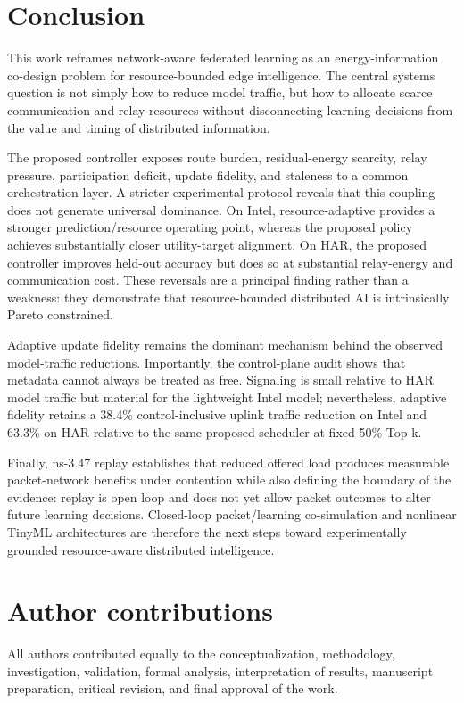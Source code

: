\documentclass[11pt]{article}
\begin{document}
\section{Conclusion}
This work reframes network-aware federated learning as an energy-information co-design problem for resource-bounded edge intelligence. The central systems question is not simply how to reduce model traffic, but how to allocate scarce communication and relay resources without disconnecting learning decisions from the value and timing of distributed information.\par
The proposed controller exposes route burden, residual-energy scarcity, relay pressure, participation deficit, update fidelity, and staleness to a common orchestration layer. A stricter experimental protocol reveals that this coupling does not generate universal dominance. On Intel, resource-adaptive provides a stronger prediction/resource operating point, whereas the proposed policy achieves substantially closer utility-target alignment. On HAR, the proposed controller improves held-out accuracy but does so at substantial relay-energy and communication cost. These reversals are a principal finding rather than a weakness: they demonstrate that resource-bounded distributed AI is intrinsically Pareto constrained.\par
Adaptive update fidelity remains the dominant mechanism behind the observed model-traffic reductions. Importantly, the control-plane audit shows that metadata cannot always be treated as free. Signaling is small relative to HAR model traffic but material for the lightweight Intel model; nevertheless, adaptive fidelity retains a 38.4\% control-inclusive uplink traffic reduction on Intel and 63.3\% on HAR relative to the same proposed scheduler at fixed 50\% Top-k.\par
Finally, ns-3.47 replay establishes that reduced offered load produces measurable packet-network benefits under contention while also defining the boundary of the evidence: replay is open loop and does not yet allow packet outcomes to alter future learning decisions. Closed-loop packet/learning co-simulation and nonlinear TinyML architectures are therefore the next steps toward experimentally grounded resource-aware distributed intelligence.\par
\section{Author contributions}
All authors contributed equally to the conceptualization, methodology, investigation, validation, formal analysis, interpretation of results, manuscript preparation, critical revision, and final approval of the work.\par
\end{document}
